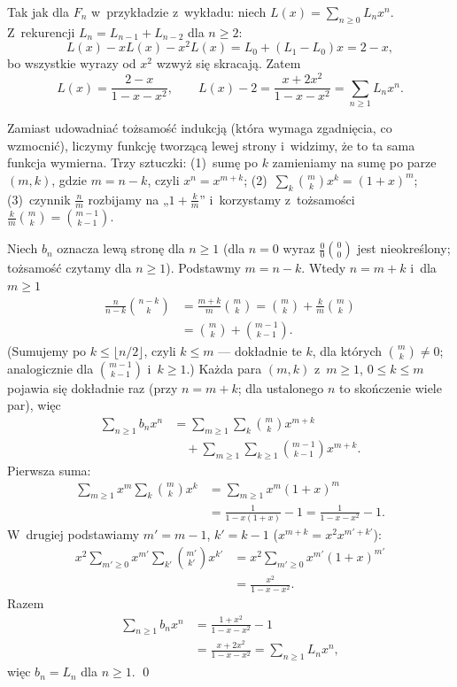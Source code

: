 \documentclass[11pt]{article}
\begin{document}
\begin{teoria}
Tak jak dla $F_n$ w~przykładzie z~wykładu:
niech $L(x)=\sum_{n\ge0}L_nx^n$. Z~rekurencji $L_n=L_{n-1}+L_{n-2}$ dla
$n\ge2$:
\[
L(x)-xL(x)-x^2L(x)=L_0+(L_1-L_0)x=2-x,
\]
bo wszystkie wyrazy od $x^2$ wzwyż się skracają. Zatem
\[
L(x)=\frac{2-x}{1-x-x^2},\qquad
L(x)-2=\frac{x+2x^2}{1-x-x^2}=\sum_{n\ge1}L_nx^n.
\]
\end{teoria}

\begin{intuicja}
Zamiast udowadniać tożsamość indukcją (która wymaga zgadnięcia, co
wzmocnić), liczymy funkcję tworzącą lewej strony i~widzimy, że to ta sama
funkcja wymierna. Trzy sztuczki: (1)~sumę po $k$ zamieniamy na sumę po
parze $(m,k)$, gdzie $m=n-k$, czyli $x^n=x^{m+k}$; (2)~$\sum_k\binom mkx^k=(1+x)^m$;
(3)~czynnik $\frac nm$ rozbijamy na „$1+\frac km$” i~korzystamy z~tożsamości
$\frac km\binom mk=\binom{m-1}{k-1}$.
\end{intuicja}

\formalnie
Niech $b_n$ oznacza lewą stronę dla $n\ge1$ (dla $n=0$ wyraz $\frac00\binom00$
jest nieokreślony; tożsamość czytamy dla $n\ge1$). Podstawmy $m=n-k$.
Wtedy $n=m+k$ i~dla $m\ge1$
\begin{align*}
\frac{n}{n-k}\binom{n-k}{k}&=\frac{m+k}{m}\binom mk=\binom mk+\frac km\binom mk\\
&=\binom mk+\binom{m-1}{k-1}.
\end{align*}
(Sumujemy po $k\le\lfloor n/2\rfloor$, czyli $k\le m$ --- dokładnie te $k$,
dla których $\binom mk\ne0$; analogicznie dla $\binom{m-1}{k-1}$ i~$k\ge1$.)
Każda para $(m,k)$ z~$m\ge1$, $0\le k\le m$ pojawia się dokładnie raz
(przy $n=m+k$; dla ustalonego $n$ to skończenie wiele par), więc
\begin{align*}
\sum_{n\ge1}b_nx^n
&=\sum_{m\ge1}\sum_{k}\binom mkx^{m+k}\\
&\quad+\sum_{m\ge1}\sum_{k\ge1}\binom{m-1}{k-1}x^{m+k}.
\end{align*}
Pierwsza suma:
\begin{align*}
\sum_{m\ge1}x^m\sum_k\binom mkx^k&=\sum_{m\ge1}x^m(1+x)^m\\
&=\frac1{1-x(1+x)}-1=\frac1{1-x-x^2}-1.
\end{align*}
W~drugiej podstawiamy $m'=m-1$, $k'=k-1$ ($x^{m+k}=x^2x^{m'+k'}$):
\begin{align*}
x^2\sum_{m'\ge0}x^{m'}\sum_{k'}\binom{m'}{k'}x^{k'}&=x^2\sum_{m'\ge0}x^{m'}(1+x)^{m'}\\
&=\frac{x^2}{1-x-x^2}.
\end{align*}
Razem
\begin{align*}
\sum_{n\ge1}b_nx^n&=\frac{1+x^2}{1-x-x^2}-1\\
&=\frac{x+2x^2}{1-x-x^2}=\sum_{n\ge1}L_nx^n,
\end{align*}
więc $b_n=L_n$ dla $n\ge1$. \qed
\end{document}
